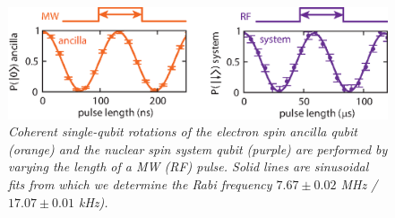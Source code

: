 \begin{figure} 
\centering
\includegraphics [width = 12 cm]{SOM/rabi.eps}
\caption{\textit{Coherent single-qubit rotations of the electron spin ancilla qubit (orange) and the nuclear spin system qubit (purple) are performed by varying the length of a MW (RF) pulse. Solid lines are sinusoidal fits from which we determine the Rabi frequency  $7.67 \pm 0.02$ MHz / $17.07 \pm 0.01$ kHz).}}
\label{fig:rabi}
\end{figure} 

